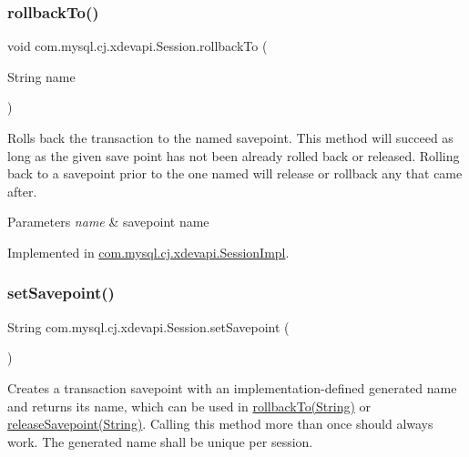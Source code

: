 \subsubsection{\texorpdfstring{rollback\+To()}{rollbackTo()}}
{\footnotesize\ttfamily void com.\+mysql.\+cj.\+xdevapi.\+Session.\+rollback\+To (\begin{DoxyParamCaption}\item[{String}]{name }\end{DoxyParamCaption})}

Rolls back the transaction to the named savepoint. This method will succeed as long as the given save point has not been already rolled back or released. Rolling back to a savepoint prior to the one named will release or rollback any that came after.


\begin{DoxyParams}{Parameters}
{\em name} & savepoint name \\
\hline
\end{DoxyParams}


Implemented in \mbox{\hyperlink{classcom_1_1mysql_1_1cj_1_1xdevapi_1_1_session_impl_adcd0910556c2529fe20a6fa85c96a88d}{com.\+mysql.\+cj.\+xdevapi.\+Session\+Impl}}.

\mbox{\label{interfacecom_1_1mysql_1_1cj_1_1xdevapi_1_1_session_a4878e02a60bbf177ea77ab94c697cbbf}} 
\subsubsection{\texorpdfstring{set\+Savepoint()}{setSavepoint()}\hspace{0.1cm}{\footnotesize\ttfamily [1/2]}}
{\footnotesize\ttfamily String com.\+mysql.\+cj.\+xdevapi.\+Session.\+set\+Savepoint (\begin{DoxyParamCaption}{ }\end{DoxyParamCaption})}

Creates a transaction savepoint with an implementation-\/defined generated name and returns its name, which can be used in \mbox{\hyperlink{interfacecom_1_1mysql_1_1cj_1_1xdevapi_1_1_session_a31dc4b454a765a159c591d5cc4f3d1cc}{rollback\+To(\+String)}} or \mbox{\hyperlink{interfacecom_1_1mysql_1_1cj_1_1xdevapi_1_1_session_ad372434e6431ce9a396a29d03f3ad8c4}{release\+Savepoint(\+String)}}. Calling this method more than once should always work. The generated name shall be unique per session.

